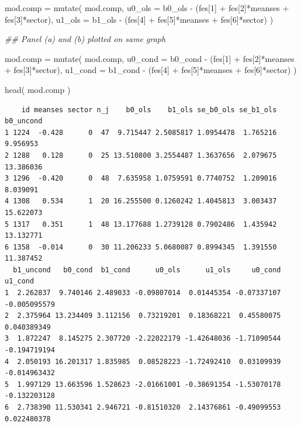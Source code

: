 \documentclass[
  letterpaper,
  DIV=11,
  numbers=noendperiod]{scrreprt}
\newenvironment{Shaded}{\begin{snugshade}}{\end{snugshade}}
\newcommand{\AttributeTok}[1]{\textcolor[rgb]{0.49,0.56,0.16}{#1}}
\newcommand{\DecValTok}[1]{\textcolor[rgb]{0.25,0.63,0.44}{#1}}
\newcommand{\DocumentationTok}[1]{\textcolor[rgb]{0.73,0.13,0.13}{\textit{#1}}}
\newcommand{\FunctionTok}[1]{\textcolor[rgb]{0.02,0.16,0.49}{#1}}
\newcommand{\NormalTok}[1]{\textcolor[rgb]{0.00,0.44,0.13}{#1}}
\newcommand{\OtherTok}[1]{\textcolor[rgb]{0.00,0.44,0.13}{#1}}
\newcommand{\SpecialCharTok}[1]{\textcolor[rgb]{0.25,0.44,0.63}{#1}}
\begin{document}
\begin{Shaded}
\begin{Highlighting}[]
\NormalTok{mod.comp }\OtherTok{=} \FunctionTok{mutate}\NormalTok{( mod.comp,}
                   \AttributeTok{u0\_ols =}\NormalTok{ b0\_ols }\SpecialCharTok{{-}}\NormalTok{ (fes[}\DecValTok{1}\NormalTok{] }\SpecialCharTok{+}\NormalTok{ fes[}\DecValTok{2}\NormalTok{]}\SpecialCharTok{*}\NormalTok{meanses }\SpecialCharTok{+}\NormalTok{ fes[}\DecValTok{3}\NormalTok{]}\SpecialCharTok{*}\NormalTok{sector),}
                   \AttributeTok{u1\_ols =}\NormalTok{ b1\_ols }\SpecialCharTok{{-}}\NormalTok{ (fes[}\DecValTok{4}\NormalTok{] }\SpecialCharTok{+}\NormalTok{ fes[}\DecValTok{5}\NormalTok{]}\SpecialCharTok{*}\NormalTok{meanses }\SpecialCharTok{+}\NormalTok{ fes[}\DecValTok{6}\NormalTok{]}\SpecialCharTok{*}\NormalTok{sector)  )}


\DocumentationTok{\#\# Panel (a) and (b) plotted on same graph}

\NormalTok{mod.comp }\OtherTok{=} \FunctionTok{mutate}\NormalTok{( mod.comp, }
                   \AttributeTok{u0\_cond =}\NormalTok{ b0\_cond }\SpecialCharTok{{-}}\NormalTok{ (fes[}\DecValTok{1}\NormalTok{] }\SpecialCharTok{+}\NormalTok{ fes[}\DecValTok{2}\NormalTok{]}\SpecialCharTok{*}\NormalTok{meanses }\SpecialCharTok{+}\NormalTok{ fes[}\DecValTok{3}\NormalTok{]}\SpecialCharTok{*}\NormalTok{sector),}
                   \AttributeTok{u1\_cond =}\NormalTok{ b1\_cond }\SpecialCharTok{{-}}\NormalTok{ (fes[}\DecValTok{4}\NormalTok{] }\SpecialCharTok{+}\NormalTok{ fes[}\DecValTok{5}\NormalTok{]}\SpecialCharTok{*}\NormalTok{meanses }\SpecialCharTok{+}\NormalTok{ fes[}\DecValTok{6}\NormalTok{]}\SpecialCharTok{*}\NormalTok{sector)  )}

\FunctionTok{head}\NormalTok{( mod.comp )}
\end{Highlighting}
\end{Shaded}

\begin{verbatim}
    id meanses sector n_j    b0_ols    b1_ols se_b0_ols se_b1_ols b0_uncond
1 1224  -0.428      0  47  9.715447 2.5085817 1.0954478  1.765216  9.956953
2 1288   0.128      0  25 13.510800 3.2554487 1.3637656  2.079675 13.386036
3 1296  -0.420      0  48  7.635958 1.0759591 0.7740752  1.209016  8.039091
4 1308   0.534      1  20 16.255500 0.1260242 1.4045813  3.003437 15.622073
5 1317   0.351      1  48 13.177688 1.2739128 0.7902486  1.435942 13.132771
6 1358  -0.014      0  30 11.206233 5.0680087 0.8994345  1.391550 11.387452
  b1_uncond   b0_cond  b1_cond      u0_ols      u1_ols     u0_cond      u1_cond
1  2.262837  9.740146 2.489033 -0.09807014  0.01445354 -0.07337107 -0.005095579
2  2.375964 13.234409 3.112156  0.73219201  0.18368221  0.45580075  0.040389349
3  1.872247  8.145275 2.307720 -2.22022179 -1.42648036 -1.71090544 -0.194719194
4  2.050193 16.201317 1.835985  0.08528223 -1.72492410  0.03109939 -0.014963432
5  1.997129 13.663596 1.528623 -2.01661001 -0.38691354 -1.53070178 -0.132203128
6  2.738390 11.530341 2.946721 -0.81510320  2.14376861 -0.49099553  0.022480378
\end{verbatim}
\end{document}
